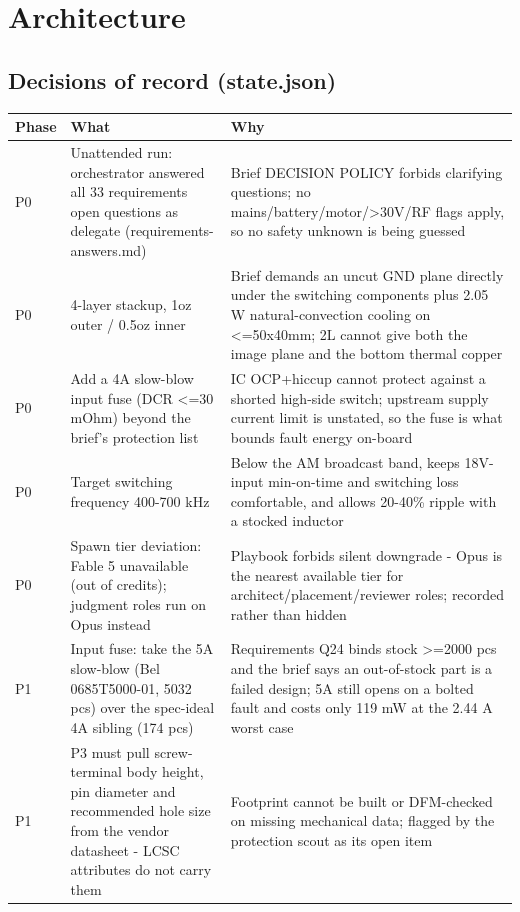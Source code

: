 \documentclass[11pt,a4paper]{article}
\begin{document}
\section{Architecture}
\subsection*{Decisions of record (state.json)}
{\small
\begin{longtable}{lp{5.2cm}p{7.2cm}}
\toprule
\textbf{Phase} & \textbf{What} & \textbf{Why} \\
\midrule
\endhead
P0 & Unattended run: orchestrator answered all 33 requirements open questions as delegate (requirements-answers.md) & Brief DECISION POLICY forbids clarifying questions; no mains/battery/motor/\textgreater{}30V/RF flags apply, so no safety unknown is being guessed \\
P0 & 4-layer stackup, 1oz outer / 0.5oz inner & Brief demands an uncut GND plane directly under the switching components plus 2.05 W natural-convection cooling on \textless{}=50x40mm; 2L cannot give both the image plane and the bottom thermal copper \\
P0 & Add a 4A slow-blow input fuse (DCR \textless{}=30 mOhm) beyond the brief's protection list & IC OCP+hiccup cannot protect against a shorted high-side switch; upstream supply current limit is unstated, so the fuse is what bounds fault energy on-board \\
P0 & Target switching frequency 400-700 kHz & Below the AM broadcast band, keeps 18V-input min-on-time and switching loss comfortable, and allows 20-40\% ripple with a stocked inductor \\
P0 & Spawn tier deviation: Fable 5 unavailable (out of credits); judgment roles run on Opus instead & Playbook forbids silent downgrade - Opus is the nearest available tier for architect/placement/reviewer roles; recorded rather than hidden \\
P1 & Input fuse: take the 5A slow-blow (Bel 0685T5000-01, 5032 pcs) over the spec-ideal 4A sibling (174 pcs) & Requirements Q24 binds stock \textgreater{}=2000 pcs and the brief says an out-of-stock part is a failed design; 5A still opens on a bolted fault and costs only 119 mW at the 2.44 A worst case \\
P1 & P3 must pull screw-terminal body height, pin diameter and recommended hole size from the vendor datasheet - LCSC attributes do not carry them & Footprint cannot be built or DFM-checked on missing mechanical data; flagged by the protection scout as its open item \\

\end{longtable}}
\end{document}
